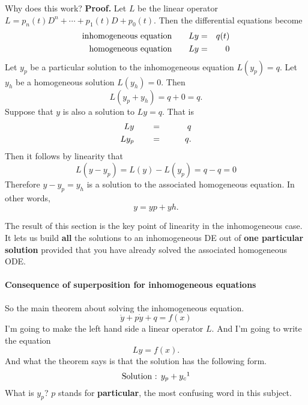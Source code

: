 Why does this work? \textbf{Proof.} Let $L$ be the linear operator
$L = p_ n(t)D^ n + \dotsb + p_1(t)D+p_0(t)$.
Then the differential equations become
\begin{eqnarray*}
  \displaystyle  \text {inhomogeneous equation} \qquad Ly
  \displaystyle &=& \displaystyle q(t) \\
  \displaystyle  \text {homogeneous equation} \qquad Ly
  \displaystyle &=& \displaystyle 0   
\end{eqnarray*}
Let $y_p$ be a particular solution to the inhomogeneous equation $L(y_p)=q$.
Let $y_h$ be a homogeneous solution $L(y_h)=0$. Then
\begin{equation*}
  L(y_ p+y_ h) =q+0=q.
\end{equation*}
Suppose that $y$ is also a solution to $Ly=q$. That is
\begin{eqnarray*}
  \displaystyle  Ly \qquad \displaystyle &=& \qquad q \\
  \displaystyle  Ly_p \qquad \displaystyle &=& \qquad q.
\end{eqnarray*}
Then it follows by linearity that
\begin{equation*}
  L(y-y_ p) = L(y)-L(y_ p) = q - q = 0
\end{equation*}
Therefore $y−y_p=y_h$ is a solution to the associated homogeneous equation. In other words,
\begin{equation*}
  y=yp+yh.
\end{equation*}

{\color{blue} The result of this section is the key point of linearity in the inhomogeneous case.}
It lets us build \textbf{all} the solutions to an inhomogeneous DE out of
\textbf{one particular solution} provided that you have already solved the associated homogeneous ODE.

\paragraph{Consequence of superposition for inhomogeneous equations}
So the {\color{blue}main theorem} about solving the inhomogeneous equation.
\begin{equation*}
  \ddot{y} + p\dot{y} + q = f(x) 
\end{equation*}
I'm going to make the left hand side a linear operator $L$.
And I'm going to write the equation
\begin{equation*}
  Ly = f(x). 
\end{equation*}
And what the theorem says is that the solution has the following form.
\begin{equation*}
  \text{Solution : } y_p + y_c\footnotemark 
\end{equation*}
What is $y_p$? $p$ stands for \textbf{particular}, the most confusing word in this subject.\\

